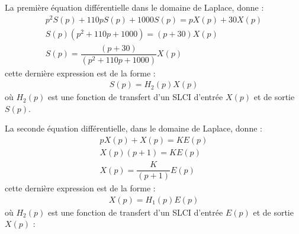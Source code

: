 

\question{}
La première équation différentielle dans le domaine de Laplace, donne : 
\begin{align*}
p^2S(p)+110pS(p)+1000S(p)=pX(p)+30X(p) \\
S(p) ( p^2+110p+1000) = (p+30)X(p) \\
S(p) = \dfrac{(p+30)}{(p^2+110p+1000)} X(p) 
\end{align*}
cette dernière expression est de la forme :
\begin{align}
S(p) = H_2(p) X(p)
\label{eq-h2}
\end{align}
où $H_2(p)$ est une fonction de transfert d'un SLCI d'entrée $X(p)$ 
et de sortie $S(p)$.
\begin{center}
\end{center}

La seconde équation différentielle, dans le domaine de Laplace, donne : 
\begin{align*}
    pX(p)+X(p)=KE(p) \\
    X(p) (p+1) = KE(p) \\
    X(p) = \dfrac{K}{(p+1)} E(p) 
\end{align*}
cette dernière expression est de la forme :
\begin{align}
X(p) = H_1(p) E(p)
\label{eq-h1}
\end{align}
où $H_2(p)$ est une fonction de transfert d'un SLCI d'entrée $E(p)$ 
et de sortie $X(p)$ :
\begin{center}
\end{center}

